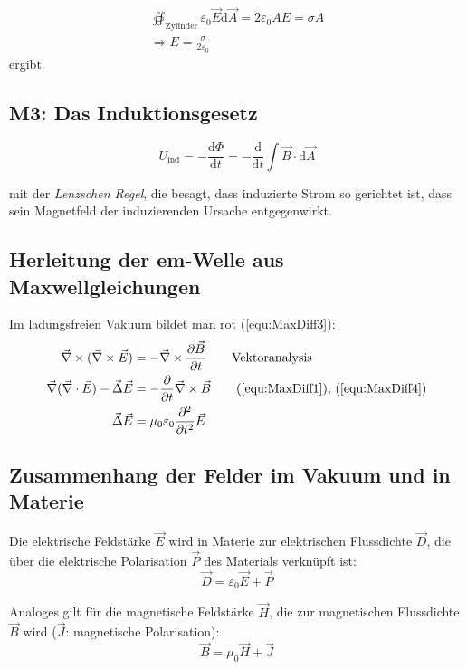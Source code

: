 \documentclass[a4paper]{scrartcl}
\begin{document}
\begin{align*}
  \oiint_\text{Zylinder} \varepsilon_0 \vec E \text{d}\vec A = 2\varepsilon_0 A E = \sigma A \\
  \Rightarrow E = \frac{\sigma}{2\varepsilon_0}
\end{align*}
ergibt.

\subsection{M3: Das Induktionsgesetz}

\begin{equation*}
  U_\text{ind} = -\frac{\text{d}\Phi}{\text{d}t} = -\frac{\text{d}}{\text{d}t} \int \vec B \cdot \text{d}\vec A
\end{equation*}

mit der \emph{Lenzschen Regel}, die besagt, dass induzierte Strom so gerichtet ist, dass sein Magnetfeld der induzierenden Ursache entgegenwirkt.


\subsection{Herleitung der em-Welle aus Maxwellgleichungen}
Im ladungsfreien Vakuum bildet man rot (\ref{equ:MaxDiff3}):
\begin{align*}
  \vec \nabla \times (\vec \nabla \times \vec E) & = - \vec \nabla \times \frac{\partial \vec B}{\partial t} \qquad \text{Vektoranalysis}\\
  \vec \nabla (\vec \nabla \cdot \vec E) - \vec \Delta \vec E & = - \frac{\partial}{\partial t} \vec \nabla \times \vec B \qquad \text{(\ref{equ:MaxDiff1}), (\ref{equ:MaxDiff4})}\\
  \vec \Delta \vec E & = \mu_0\varepsilon_0 \frac{\partial^2}{\partial t^2} \vec E
\end{align*}

\subsection{Zusammenhang der Felder im Vakuum und in Materie}
Die elektrische Feldstärke $\vec E$ wird in Materie zur elektrischen Flussdichte $\vec D$, die über die elektrische Polarisation $\vec P$ des Materials verknüpft ist:
\begin{equation*}
  \vec D = \varepsilon_0 \vec E + \vec P
\end{equation*}

Analoges gilt für die magnetische Feldstärke $\vec H$, die zur magnetischen Flussdichte $\vec B$ wird ($\vec J$: magnetische Polarisation):
\begin{equation*}
  \vec B = \mu_0 \vec H + \vec J
\end{equation*}
\end{document}
